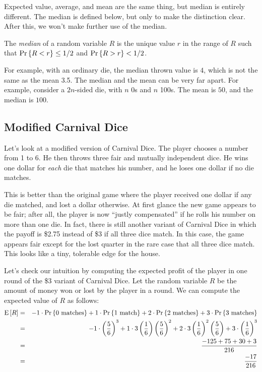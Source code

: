 \documentclass[11pt,twoside]{article}
\begin{document}
Expected value, average, and mean are the same thing, but median is
entirely different.  The median is defined below, but only to make the
distinction clear.  After this, we won't make further use of the median.

\begin{definition}
The {\em median} of a random variable $R$ is the unique value $r$ in the
range of $R$ such that $\mathop{\textup{Pr}}\nolimits\left\{R < r\right\} \leq 1/2$ and $\mathop{\textup{Pr}}\nolimits\left\{R > r\right\} < 1/2$.

\end{definition}

For example, with an ordinary die, the median thrown value is $4$, which
is not the same as the mean 3.5.  The median and the mean can be very far
apart.  For example, consider a $2n$-sided die, with $n$ 0s and $n$ 100s.
The mean is $50$, and the median is $100$.

\subsection{Modified Carnival Dice}

Let's look at a modified version of Carnival Dice.  The player chooses a
number from 1 to 6.  He then throws three fair and mutually independent
dice.  He wins one dollar for \emph{each} die that matches his number, and
he loses one dollar if no die matches.

This is better than the original game where the player received one
dollar if any die matched, and lost a dollar otherwise.  At first
glance the new game appears to be fair; after all, the player is now
``justly compensated'' if he rolls his number on more than one die.
In fact, there is still another variant of Carnival Dice in which the
payoff is \$2.75 instead of \$3 if all three dice match.  In this
case, the game appears fair except for the lost quarter in the rare
case that all three dice match.  This looks like a tiny, tolerable
edge for the house.

Let's check our intuition by computing the expected profit of the
player in one round of the \$3 variant of Carnival Dice.  Let the
random variable $R$ be the amount of money won or lost by the player
in a round.  We can compute the expected value of $R$ as follows:
\begin{eqnarray*}
\mathop{\textup{E}}\nolimits\left[R\right]  & = &   -1  \cdot \mathop{\textup{Pr}}\nolimits\left\{\mbox{0 matches}\right\} +
                     1 \cdot \mathop{\textup{Pr}}\nolimits\left\{\mbox{1 match}\right\} +
                     2  \cdot \mathop{\textup{Pr}}\nolimits\left\{\mbox{2 matches}\right\} +
                     3 \cdot \mathop{\textup{Pr}}\nolimits\left\{\mbox{3 matches}\right\} \\
        & = &   -1 \cdot \left(\frac{5}{6}\right)^3 +
                1 \cdot 3\left(\frac{1}{6}\right)\left(\frac{5}{6}\right)^2+
                2 \cdot 3\left(\frac{1}{6}\right)^2\left(\frac{5}{6}\right)+
                3 \cdot \left(\frac{1}{6}\right)^3 \\
        & = &   \frac{-125 + 75 + 30 + 3}{216} \\
        & = &   \frac{-17}{216}
\end{eqnarray*}
\end{document}
